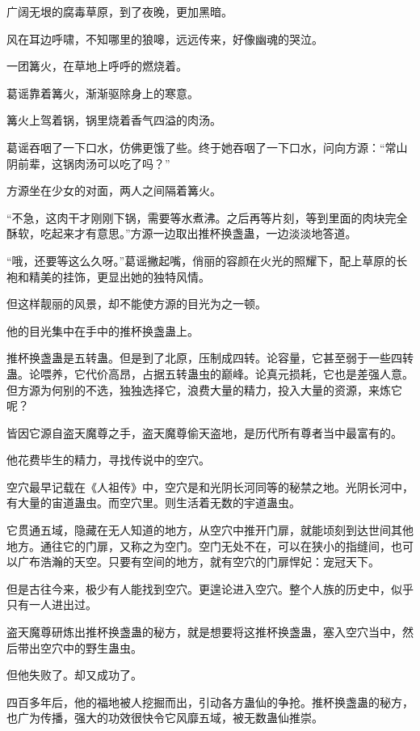
\begin{this_body}

广阔无垠的腐毒草原，到了夜晚，更加黑暗。

风在耳边呼啸，不知哪里的狼嗥，远远传来，好像幽魂的哭泣。

一团篝火，在草地上呼呼的燃烧着。

葛谣靠着篝火，渐渐驱除身上的寒意。

篝火上驾着锅，锅里烧着香气四溢的肉汤。

葛谣吞咽了一下口水，仿佛更饿了些。终于她吞咽了一下口水，问向方源：“常山阴前辈，这锅肉汤可以吃了吗？”

方源坐在少女的对面，两人之间隔着篝火。

“不急，这肉干才刚刚下锅，需要等水煮沸。之后再等片刻，等到里面的肉块完全酥软，吃起来才有意思。”方源一边取出推杯换盏蛊，一边淡淡地答道。

“哦，还要等这么久呀。”葛谣撇起嘴，俏丽的容颜在火光的照耀下，配上草原的长袍和精美的挂饰，更显出她的独特风情。

但这样靓丽的风景，却不能使方源的目光为之一顿。

他的目光集中在手中的推杯换盏蛊上。

推杯换盏蛊是五转蛊。但是到了北原，压制成四转。论容量，它甚至弱于一些四转蛊。论喂养，它代价高昂，占据五转蛊虫的巅峰。论真元损耗，它也是差强人意。但方源为何别的不选，独独选择它，浪费大量的精力，投入大量的资源，来炼它呢？

皆因它源自盗天魔尊之手，盗天魔尊偷天盗地，是历代所有尊者当中最富有的。

他花费毕生的精力，寻找传说中的空穴。

空穴最早记载在《人祖传》中，空穴是和光阴长河同等的秘禁之地。光阴长河中，有大量的宙道蛊虫。而空穴里。则生活着无数的宇道蛊虫。

它贯通五域，隐藏在无人知道的地方，从空穴中推开门扉，就能顷刻到达世间其他地方。通往它的门扉，又称之为空门。空门无处不在，可以在狭小的指缝间，也可以广布浩瀚的天空。只要有空间的地方，就有空穴的门扉悍妃：宠冠天下。

但是古往今来，极少有人能找到空穴。更遑论进入空穴。整个人族的历史中，似乎只有一人进出过。

盗天魔尊研炼出推杯换盏蛊的秘方，就是想要将这推杯换盏蛊，塞入空穴当中，然后带出空穴中的野生蛊虫。

但他失败了。却又成功了。

四百多年后，他的福地被人挖掘而出，引动各方蛊仙的争抢。推杯换盏蛊的秘方，也广为传播，强大的功效很快令它风靡五域，被无数蛊仙推崇。


\end{this_body}
